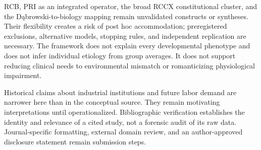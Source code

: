 RCB, PRI as an integrated operator, the broad RCCX constitutional cluster, and the Dąbrowski-to-biology mapping remain unvalidated constructs or syntheses. Their flexibility creates a risk of post hoc accommodation; preregistered exclusions, alternative models, stopping rules, and independent replication are necessary. The framework does not explain every developmental phenotype and does not infer individual etiology from group averages. It does not support reducing clinical needs to environmental mismatch or romanticizing physiological impairment.

Historical claims about industrial institutions and future labor demand are narrower here than in the conceptual source. They remain motivating interpretations until operationalized. Bibliographic verification establishes the identity and relevance of a cited study, not a forensic audit of its raw data. Journal-specific formatting, external domain review, and an author-approved disclosure statement remain submission steps.
